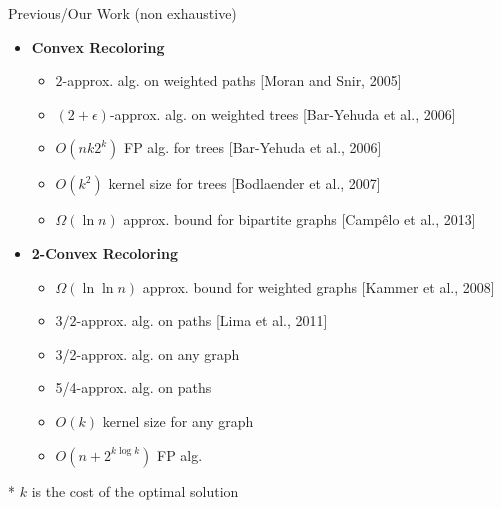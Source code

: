 \def\refsize{\tiny}

\begin{frame}{Previous/\alert{Our} Work (non exhaustive)}
\begin{itemize}
\item
\textbf{Convex Recoloring}
\begin{itemize}

\pause\item
$2$-approx. alg. on weighted paths 
{\refsize[Moran and Snir, 2005]}

\pause\item
$(2 + \epsilon)$-approx. alg. on weighted trees 
{\refsize[Bar-Yehuda et al., 2006]}

\pause\item
$O(n k 2^{k})$ FP alg. for trees
{\refsize[Bar-Yehuda et al., 2006]}

\pause\item
$O(k^2)$ kernel size for trees
{\refsize[Bodlaender et al., 2007]}

\pause\item
$\Omega(\ln{n})$ approx. bound for bipartite graphs
{\refsize[Camp\^elo et al., 2013]}


\end{itemize}
\pause\item
\textbf{2-Convex Recoloring}
\begin{itemize}


\pause\item
$\Omega(\ln\ln{n})$ approx. bound for weighted graphs
{\refsize[Kammer et al., 2008]}

\pause\item
$3/2$-approx. alg. on paths
{\refsize[Lima et al., 2011]}

\pause\item
\alert{3/2-approx. alg. on any graph}

\pause\item
\alert{5/4-approx. alg. on paths}

\pause\item
\alert{$O(k)$ kernel size for any graph}

\pause\item
\alert{$O(n + 2^{k\log k})$ FP alg.}



\end{itemize}
\end{itemize}
* $k$ is the cost of the optimal solution
\end{frame}